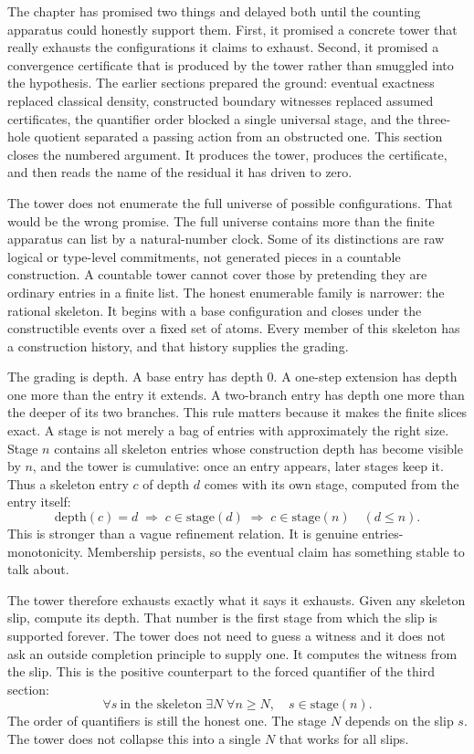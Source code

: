 The chapter has promised two things and delayed both until the counting
apparatus could honestly support them. First, it promised a concrete tower that
really exhausts the configurations it claims to exhaust. Second, it promised a
convergence certificate that is produced by the tower rather than smuggled into
the hypothesis. The earlier sections prepared the ground: eventual exactness
replaced classical density, constructed boundary witnesses replaced assumed
certificates, the quantifier order blocked a single universal stage, and the
three-hole quotient separated a passing action from an obstructed one. This
section closes the numbered argument. It produces the tower, produces the
certificate, and then reads the name of the residual it has driven to zero.

The tower does not enumerate the full universe of possible configurations. That
would be the wrong promise. The full universe contains more than the finite
apparatus can list by a natural-number clock. Some of its distinctions are raw
logical or type-level commitments, not generated pieces in a countable
construction. A countable tower cannot cover those by pretending they are
ordinary entries in a finite list. The honest enumerable family is narrower: the
rational skeleton. It begins with a base configuration and closes under the
constructible events over a fixed set of atoms. Every member of this skeleton
has a construction history, and that history supplies the grading.

The grading is depth. A base entry has depth \(0\). A one-step extension has
depth one more than the entry it extends. A two-branch entry has depth one more
than the deeper of its two branches. This rule matters because it makes the
finite slices exact. A stage is not merely a bag of entries with approximately
the right size. Stage \(n\) contains all skeleton entries whose construction
depth has become visible by \(n\), and the tower is cumulative: once an entry
appears, later stages keep it. Thus a skeleton entry \(c\) of depth \(d\) comes
with its own stage, computed from the entry itself:
\[
  \text{depth}(c)=d
  \;\Longrightarrow\;
  c \in \text{stage}(d)
  \;\Longrightarrow\;
  c \in \text{stage}(n)\quad(d\leq n).
\]
This is stronger than a vague refinement relation. It is genuine
entries-monotonicity. Membership persists, so the eventual claim has something
stable to talk about.

The tower therefore exhausts exactly what it says it exhausts. Given any
skeleton slip, compute its depth. That number is the first stage from which the
slip is supported forever. The tower does not need to guess a witness and it
does not ask an outside completion principle to supply one. It computes the
witness from the slip. This is the positive counterpart to the forced
quantifier of the third section:
\[
  \forall s\ \text{in the skeleton}\;\exists N\;\forall n\geq N,\quad
  s\in\text{stage}(n).
\]
The order of quantifiers is still the honest one. The stage \(N\) depends on
the slip \(s\). The tower does not collapse this into a single \(N\) that works
for all slips.

